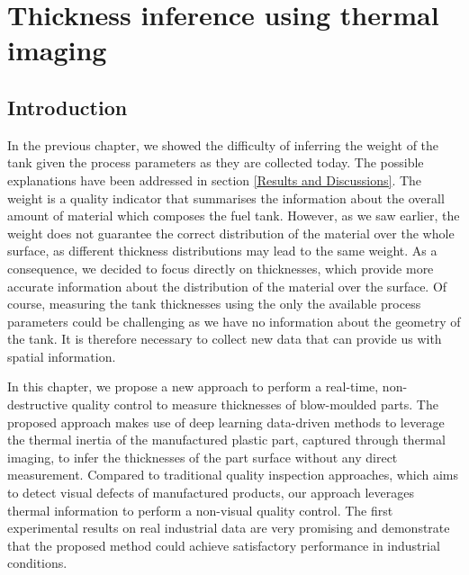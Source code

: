 \chapter{Thickness inference using thermal imaging} \label{Thickness inference using thermal imaging}
\minitoc




\section{Introduction}

In the previous chapter, we showed the difficulty of inferring the weight of the tank given the process parameters as they are collected today. The possible explanations have been addressed in section \ref{Results and Discussions}. The weight is a quality indicator that summarises the information about the overall amount of material which composes the fuel tank. However, as we saw earlier, the weight does not guarantee the correct distribution of the material over the whole surface, as different thickness distributions may lead to the same weight. As a consequence, we decided to focus directly on thicknesses, which provide more accurate information about the distribution of the material over the surface. Of course, measuring the tank thicknesses using the only the available process parameters could be challenging as we have no information about the geometry of the tank. It is therefore necessary to collect new data that can provide us with spatial information.

In this chapter, we propose a new approach to perform a real-time, non-destructive quality control to measure thicknesses of blow-moulded parts. The proposed approach makes use of deep learning data-driven methods to leverage the thermal inertia of the manufactured plastic part, captured through thermal imaging, to infer the thicknesses of the part surface without any direct measurement. Compared to traditional quality inspection approaches, which aims to detect visual defects of manufactured products, our approach leverages thermal information to perform a non-visual quality control. The first experimental results on real industrial data are very promising and demonstrate that the proposed method could achieve satisfactory performance in industrial conditions.

